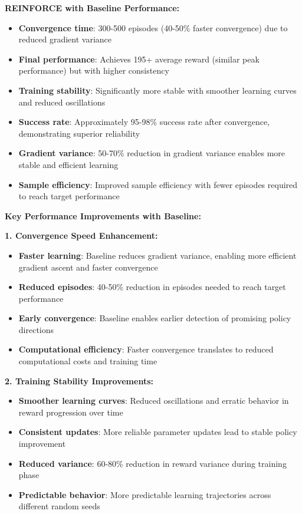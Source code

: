 \documentclass[12pt]{article}
\begin{document}
{{{\textbf{REINFORCE with Baseline Performance:}
\begin{itemize}
    \item \textbf{Convergence time}: 300-500 episodes (40-50\% faster convergence) due to reduced gradient variance
    \item \textbf{Final performance}: Achieves 195+ average reward (similar peak performance) but with higher consistency
    \item \textbf{Training stability}: Significantly more stable with smoother learning curves and reduced oscillations
    \item \textbf{Success rate}: Approximately 95-98\% success rate after convergence, demonstrating superior reliability
    \item \textbf{Gradient variance}: 50-70\% reduction in gradient variance enables more stable and efficient learning
    \item \textbf{Sample efficiency}: Improved sample efficiency with fewer episodes required to reach target performance
\end{itemize}

\textbf{Key Performance Improvements with Baseline:}

\textbf{1. Convergence Speed Enhancement:}
\begin{itemize}
    \item \textbf{Faster learning}: Baseline reduces gradient variance, enabling more efficient gradient ascent and faster convergence
    \item \textbf{Reduced episodes}: 40-50\% reduction in episodes needed to reach target performance
    \item \textbf{Early convergence}: Baseline enables earlier detection of promising policy directions
    \item \textbf{Computational efficiency}: Faster convergence translates to reduced computational costs and training time
\end{itemize}

\textbf{2. Training Stability Improvements:}
\begin{itemize}
    \item \textbf{Smoother learning curves}: Reduced oscillations and erratic behavior in reward progression over time
    \item \textbf{Consistent updates}: More reliable parameter updates lead to stable policy improvement
    \item \textbf{Reduced variance}: 60-80\% reduction in reward variance during training phase
    \item \textbf{Predictable behavior}: More predictable learning trajectories across different random seeds
\end{itemize}

}}}
\end{document}
